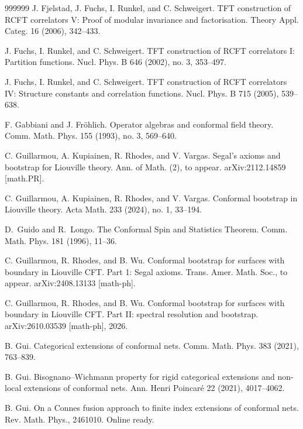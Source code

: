 \documentclass[11pt,b5paper,notitlepage]{article}
\theoremstyle{definition}
\theoremstyle{plain}
\numberwithin{equation}{section}
\begin{document}
\begin{thebibliography}{999999}
J. Fjelstad, J. Fuchs, I. Runkel, and C. Schweigert.
TFT construction of RCFT correlators V: Proof of modular invariance and factorisation.
Theory Appl. Categ. 16 (2006), 342--433.



J. Fuchs, I. Runkel, and C. Schweigert.
TFT construction of RCFT correlators I: Partition functions.
Nucl. Phys. B 646 (2002), no. 3, 353--497.

J. Fuchs, I. Runkel, and C. Schweigert.
TFT construction of RCFT correlators IV: Structure constants and correlation functions.
Nucl. Phys. B 715 (2005), 539--638.

F. Gabbiani and J. Fr\"ohlich. Operator algebras and conformal field theory. Comm. Math. Phys. 155 (1993), no. 3, 569--640.


C. Guillarmou, A. Kupiainen, R. Rhodes, and V. Vargas.
Segal's axioms and bootstrap for Liouville theory.
Ann. of Math. (2), to appear. arXiv:2112.14859 [math.PR].

C. Guillarmou, A. Kupiainen, R. Rhodes, and V. Vargas.
Conformal bootstrap in Liouville theory.
Acta Math. 233 (2024), no. 1, 33--194.

D.~Guido and R.~Longo. The Conformal Spin and Statistics Theorem.
Comm. Math. Phys. 181 (1996), 11--36.


C. Guillarmou, R. Rhodes, and B. Wu.
Conformal bootstrap for surfaces with boundary in Liouville CFT. Part 1: Segal axioms.
Trans. Amer. Math. Soc., to appear.
arXiv:2408.13133 [math-ph].

C. Guillarmou, R. Rhodes, and B. Wu.
Conformal bootstrap for surfaces with boundary in Liouville CFT. Part II: spectral resolution and bootstrap.
arXiv:2610.03539 [math-ph], 2026.


B. Gui. Categorical extensions of conformal nets.  Comm. Math. Phys. 383 (2021), 763--839.

 B. Gui. Bisognano--Wichmann property for rigid categorical extensions and non-local extensions of conformal nets. Ann. Henri Poincar\'e 22 (2021), 4017--4062.


B. Gui.
On a Connes fusion approach to finite index extensions of conformal nets.
Rev. Math. Phys., 2461010. Online ready. 




\end{thebibliography}
\end{document}
